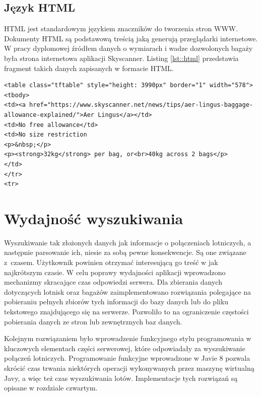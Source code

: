 \documentclass[12pt, twoside]{report}
\begin{document}
\subsection{Język HTML}
HTML jest standardowym językiem znaczników do tworzenia stron WWW. Dokumenty HTML są podstawową treścią jaką generują przeglądarki internetowe. W pracy dyplomowej źródłem danych o wymiarach i wadze dozwolonych bagaży była strona internetowa aplikacji Skyscanner\cite{html}. Listing \ref{lst::html} przedstawia fragment takich danych zapisanych w formacie HTML.
\begin{lstlisting}[language=HTML5, caption= Fragment dokumentu HTML, label=lst::html]
<table class="tftable" style="height: 3990px" border="1" width="578">
<tbody>
<td><a href="https://www.skyscanner.net/news/tips/aer-lingus-baggage-allowance-explained/">Aer Lingus</a></td>
<td>No free allowance</td>
<td>No size restriction
<p>&nbsp;</p>
<p><strong>32kg</strong> per bag, or<br>40kg across 2 bags</p>
</td>
</tr>
<tr>
\end{lstlisting}

\section{Wydajność wyszukiwania}
Wyszukiwanie tak złożonych danych jak informacje o połączeniach lotniczych, a następnie parsowanie ich, niesie za sobą pewne konsekwencje. Są one związane z~czasem. Użytkownik powinien otrzymać interesującą go treść w jak najkrótszym czasie. W celu poprawy wydajności aplikacji wprowadzono mechanizmy skracające czas odpowiedzi serwera.
Dla zbierania danych dotyczących lotnisk oraz bagażów zaimplementowano rozwiązania polegające na pobieraniu pełnych zbiorów tych informacji do bazy danych lub do pliku tekstowego znajdującego się na serwerze. Pozwoliło to na ograniczenie częstości pobierania danych ze stron lub zewnętrznych baz danych.

Kolejnym rozwiązaniem było wprowadzenie funkcyjnego stylu programowania w kluczowych elementach części serwerowej, które odpowiadały za wyszukiwanie połączeń lotniczych.  Programowanie funkcyjne wprowadzone w Javie 8 pozwala skrócić czas trwania niektórych operacji wykonywanych przez maszynę wirtualną Javy, a więc też czas wyszukiwania lotów.
Implementacje tych rozwiązań są opisane w rozdziale czwartym.
\end{document}
